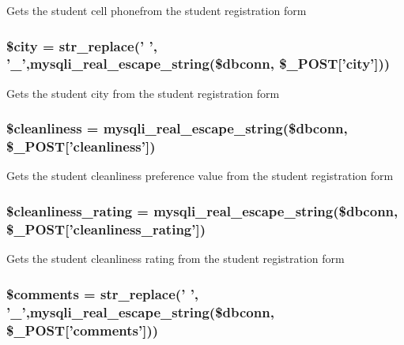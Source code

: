 \-Gets the student cell phonefrom the student registration form \hypertarget{user__view_2validate_2studentVal_8php_a5b9ddd3e3a69d8901270064346bdef49}{
\subsubsection[{\$city}]{\setlength{\rightskip}{0pt plus 5cm}\$city = str\-\_\-replace(' ', '\-\_\-',mysqli\-\_\-real\-\_\-escape\-\_\-string(\$dbconn, \$\-\_\-\-P\-O\-S\-T\mbox{[}'city'\mbox{]}))}}\label{user__view_2validate_2studentVal_8php_a5b9ddd3e3a69d8901270064346bdef49}
\-Gets the student city from the student registration form \hypertarget{user__view_2validate_2studentVal_8php_a7a259082f57125b6bd143f3387a5f655}{
\subsubsection[{\$cleanliness}]{\setlength{\rightskip}{0pt plus 5cm}\$cleanliness = mysqli\-\_\-real\-\_\-escape\-\_\-string(\$dbconn, \$\-\_\-\-P\-O\-S\-T\mbox{[}'cleanliness'\mbox{]})}}\label{user__view_2validate_2studentVal_8php_a7a259082f57125b6bd143f3387a5f655}
\-Gets the student cleanliness preference value from the student registration form \hypertarget{user__view_2validate_2studentVal_8php_aa181e44821f174a8b2551d5c30c03c1d}{
\subsubsection[{\$cleanliness\-\_\-rating}]{\setlength{\rightskip}{0pt plus 5cm}\$cleanliness\-\_\-rating = mysqli\-\_\-real\-\_\-escape\-\_\-string(\$dbconn, \$\-\_\-\-P\-O\-S\-T\mbox{[}'cleanliness\-\_\-rating'\mbox{]})}}\label{user__view_2validate_2studentVal_8php_aa181e44821f174a8b2551d5c30c03c1d}
\-Gets the student cleanliness rating from the student registration form \hypertarget{user__view_2validate_2studentVal_8php_a35e8cdeb473a5eb016fea893d14de951}{
\subsubsection[{\$comments}]{\setlength{\rightskip}{0pt plus 5cm}\$comments = str\-\_\-replace(' ', '\-\_\-',mysqli\-\_\-real\-\_\-escape\-\_\-string(\$dbconn, \$\-\_\-\-P\-O\-S\-T\mbox{[}'comments'\mbox{]}))}}\label{user__view_2validate_2studentVal_8php_a35e8cdeb473a5eb016fea893d14de951}
